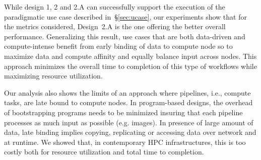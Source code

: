 While design 1, 2 and 2.A can successfully support the execution of the paradigmatic use case described in~\S\ref{sec:ucase}, our experiments show that for the metrics considered, Design~2.A is the one offering the better overall performance.
Generalizing this result, use cases that are both data-driven and compute-intense benefit from early binding of data to compute node so to maximize data and compute affinity and equally balance input across nodes.
This approach minimizes the overall time to completion of this type of workflows while maximizing resource utilization.

Our analysis also shows the limits of an approach where pipelines, i.e., compute tasks, are late bound to compute nodes.
In program-based designs, the overhead of bootstrapping programs needs to be minimized insuring that each pipeline processes as much input as possible (e.g. images).
In presence of large amount of data, late binding implies copying, replicating or accessing data over network and at runtime.
We showed that, in contemporary HPC infrastructures, this is too costly both for resource utilization and total time to completion.


